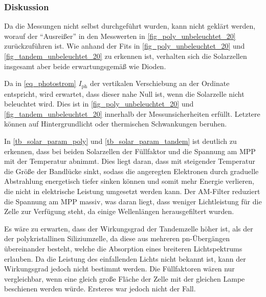 \documentclass[
	a4paper,
	12pt,
	pagesize,
	ngerman
]{scrartcl}
\begin{document}
	\subsubsection{Diskussion}
	Da die Messungen nicht selbst durchgeführt wurden, kann nicht geklärt werden, worauf der \enquote{Ausreißer} in den Messwerten in \cref{fig_poly_unbeleuchtet_20} zurückzuführen ist.
	Wie anhand der Fits in \cref{fig_poly_unbeleuchtet_20} und \cref{fig_tandem_unbeleuchtet_20} zu erkennen ist, verhalten sich die Solarzellen insgesamt aber beide erwartungsgemäß wie Dioden.

	Da in \cref{eq_photostrom} $I_\text{ph}$ der vertikalen Verschiebung an der Ordinate entspricht, wird erwartet, dass dieser nahe Null ist, wenn die Solarzelle nicht beleuchtet wird.
	Dies ist in \cref{fig_poly_unbeleuchtet_20} und \cref{fig_tandem_unbeleuchtet_20} innerhalb der Messunsicherheiten erfüllt.
	Letztere können auf Hintergrundlicht oder thermischen Schwankungen beruhen.

	In \cref{tb_solar_param_poly} und \cref{tb_solar_param_tandem} ist deutlich zu erkennen, dass bei beiden Solarzellen der Füllfaktor und die Spannung am MPP mit der Temperatur abnimmt.
	Dies liegt daran, dass mit steigender Temperatur die Größe der Bandlücke sinkt, sodass die angeregten Elektronen durch graduelle Abstrahlung energetisch tiefer sinken können und somit mehr Energie verlieren, die nicht in elektrische Leistung umgesetzt werden kann. %
	Der AM-Filter reduziert die Spannung am MPP massiv, was daran liegt, dass weniger Lichtleistung für die Zelle zur Verfügung steht, da einige Wellenlängen herausgefiltert wurden.

	Es wäre zu erwarten, dass der Wirkungsgrad der Tandemzelle höher ist, als der der polykristallinen Siliziumzelle, da diese aus mehreren pn-Übergängen übereinander besteht, welche die Absorption eines breiteren Lichtspektrums erlauben.
	Da die Leistung des einfallenden Lichts nicht bekannt ist, kann der Wirkungsgrad jedoch nicht bestimmt werden.
	Die Füllfaktoren wären nur vergleichbar, wenn eine gleich große Fläche der Zelle mit der gleichen Lampe beschienen werden würde.
	Ersteres war jedoch nicht der Fall.


\end{document}
